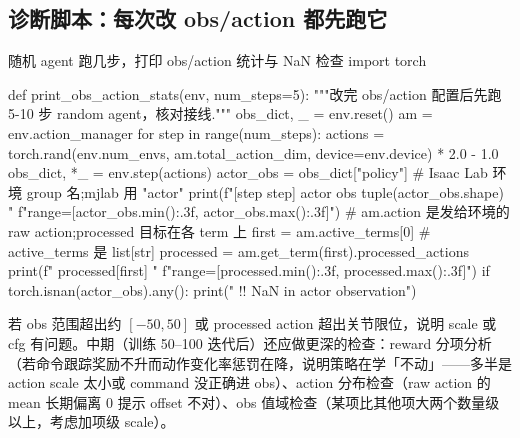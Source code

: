 \subsection{诊断脚本：每次改 obs/action 都先跑它}
\label{sec:rlmc-diagnostic}

\begin{codebox}[Python]{随机 agent 跑几步，打印 obs/action 统计与 NaN 检查}
import torch

def print_obs_action_stats(env, num_steps=5):
    """改完 obs/action 配置后先跑 5-10 步 random agent，核对接线."""
    obs_dict, _ = env.reset()
    am = env.action_manager
    for step in range(num_steps):
        actions = torch.rand(env.num_envs, am.total_action_dim,
                             device=env.device) * 2.0 - 1.0
        obs_dict, *_ = env.step(actions)
        actor_obs = obs_dict["policy"]      # Isaac Lab 环境 group 名;mjlab 用 "actor"
        print(f"[step {step}] actor obs {tuple(actor_obs.shape)} "
              f"range=[{actor_obs.min():.3f}, {actor_obs.max():.3f}]")
        # am.action 是发给环境的 raw action;processed 目标在各 term 上
        first = am.active_terms[0]           # active_terms 是 list[str]
        processed = am.get_term(first).processed_actions
        print(f"          processed[{first}] "
              f"range=[{processed.min():.3f}, {processed.max():.3f}]")
        if torch.isnan(actor_obs).any():
            print("  !! NaN in actor observation")
\end{codebox}

若 obs 范围超出约 $[-50,50]$ 或 processed action 超出关节限位，说明 scale 或 cfg 有问题。中期（训练 50--100 迭代后）还应做更深的检查：reward 分项分析（若命令跟踪奖励不升而动作变化率惩罚在降，说明策略在学「不动」——多半是 action scale 太小或 command 没正确进 obs）、action 分布检查（raw action 的 mean 长期偏离 0 提示 offset 不对）、obs 值域检查（某项比其他项大两个数量级以上，考虑加项级 scale）。

